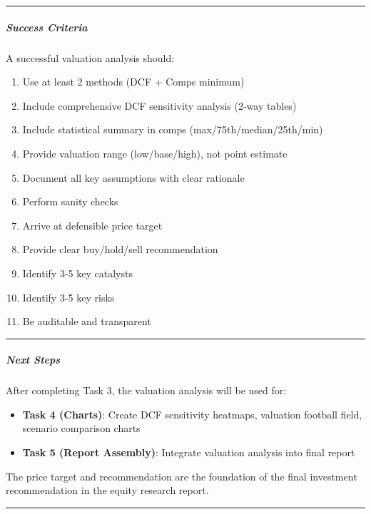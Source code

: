 \documentclass[11pt]{article}
\begin{document}
\vspace{0.5em}\hrule\vspace{0.5em}

\subparagraph{Success Criteria}\mbox{}\par

A successful valuation analysis should:

\begin{enumerate}[leftmargin=*,itemsep=2pt,topsep=2pt]
\item {} Use at least 2 methods (DCF + Comps minimum)
\item {} Include comprehensive DCF sensitivity analysis (2-way tables)
\item {} Include statistical summary in comps (max/75th/median/25th/min)
\item {} Provide valuation range (low/base/high), not point estimate
\item {} Document all key assumptions with clear rationale
\item {} Perform sanity checks
\item {} Arrive at defensible price target
\item {} Provide clear buy/hold/sell recommendation
\item {} Identify 3-5 key catalysts
\item {} Identify 3-5 key risks
\item {} Be auditable and transparent
\end{enumerate}

\vspace{0.5em}\hrule\vspace{0.5em}

\subparagraph{Next Steps}\mbox{}\par

After completing Task 3, the valuation analysis will be used for:

\begin{itemize}[leftmargin=*,itemsep=2pt,topsep=2pt]
\item {} \textbf{Task 4 (Charts)}: Create DCF sensitivity heatmaps, valuation football field, scenario comparison charts
\item {} \textbf{Task 5 (Report Assembly)}: Integrate valuation analysis into final report
\end{itemize}

The price target and recommendation are the foundation of the final investment recommendation in the equity research report.


\vspace{0.8em}\hrule\vspace{0.8em}
\end{document}
